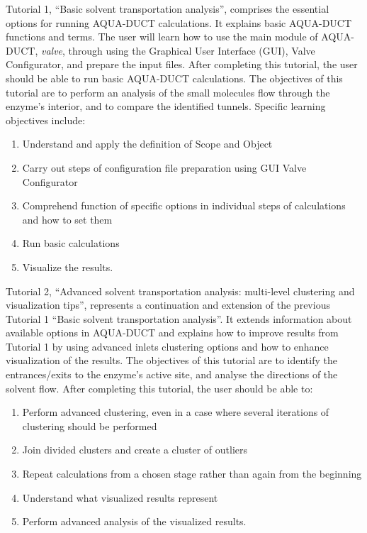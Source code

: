 \documentclass[9pt,tutorial]{livecoms}
\begin{document}
Tutorial 1, “Basic solvent transportation analysis”, comprises the essential options for running AQUA-DUCT calculations. It explains basic AQUA-DUCT functions and terms. The user will learn how to use the main module of AQUA-DUCT, \textit{valve}, through using the Graphical User Interface (GUI), Valve Configurator, and prepare the input files. After completing this tutorial, the user should be able to run basic AQUA-DUCT calculations. The objectives of this tutorial are to perform an analysis of the small molecules flow through the enzyme's interior, and to compare the identified tunnels. Specific learning objectives include:
\begin{enumerate}
  \item Understand and apply the definition of Scope and Object
  \item Carry out steps of configuration file preparation using GUI Valve Configurator
  \item Comprehend function of specific options in individual steps of calculations and how to set them
  \item Run basic calculations
  \item Visualize the results.
\end{enumerate}

Tutorial 2, “Advanced solvent transportation analysis: multi-level clustering and visualization tips”, represents a continuation and extension of the previous Tutorial 1 “Basic solvent transportation analysis”. It extends information about available options in AQUA-DUCT and explains how to improve results from Tutorial 1 by using advanced inlets clustering options and how to enhance visualization of the results. The objectives of this tutorial are to identify the entrances/exits to the enzyme's active site, and analyse the directions of the solvent flow. After completing this tutorial, the user should be able to:
\begin{enumerate}
  \item Perform advanced clustering, even in a case where several iterations of clustering should be performed
  \item Join divided clusters and create a cluster of outliers
  \item Repeat calculations from a chosen stage rather than again from the beginning
  \item Understand what visualized results represent
  \item Perform advanced analysis of the visualized results.
\end{enumerate}
\end{document}
